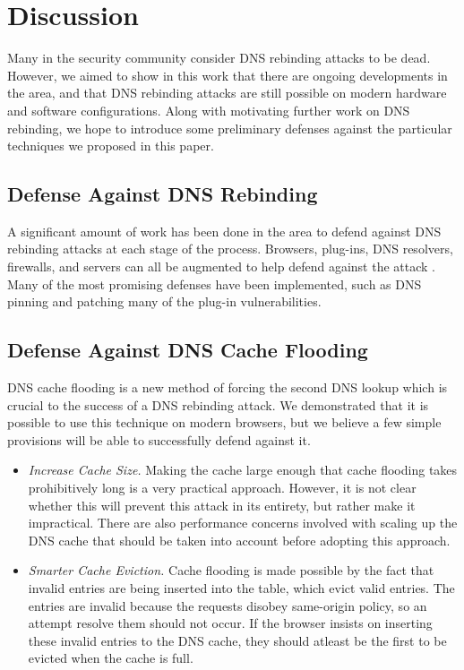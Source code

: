 \section{Discussion}
\label{sec:disc}

Many in the security community consider DNS rebinding attacks to be dead. However, we aimed to show in this work that there are ongoing developments in the area, and that DNS rebinding attacks are still possible on modern hardware and software configurations. Along with motivating further work on DNS rebinding, we hope to introduce some preliminary defenses against the particular techniques we proposed in this paper.

\subsection{Defense Against DNS Rebinding}

A significant amount of work has been done in the area to defend against DNS rebinding attacks at each stage of the process. Browsers, plug-ins, DNS resolvers, firewalls, and servers can all be augmented to help defend against the attack \cite{protectFromDNS}. Many of the most promising defenses have been implemented, such as DNS pinning and patching many of the plug-in vulnerabilities.

\subsection{Defense Against DNS Cache Flooding}

DNS cache flooding is a new method of forcing the second DNS lookup which is crucial to the success of a DNS rebinding attack. We demonstrated that it is possible to use this technique on modern browsers, but we believe a few simple provisions will be able to successfully defend against it. 

\begin{itemize}
\item \emph{Increase Cache Size.} Making the cache large enough that cache flooding takes prohibitively long is a very practical approach. However, it is not clear whether this will prevent this attack in its entirety, but rather make it impractical. There are also performance concerns involved with scaling up the DNS cache that should be taken into account before adopting this approach. 
\item \emph{Smarter Cache Eviction.} Cache flooding is made possible by the fact that invalid entries are being inserted into the table, which evict valid entries. The entries are invalid because the requests disobey same-origin policy, so an attempt resolve them should not occur. If the browser insists on inserting these invalid entries to the DNS cache, they should atleast be the first to be evicted when the cache is full.
\end{itemize}

